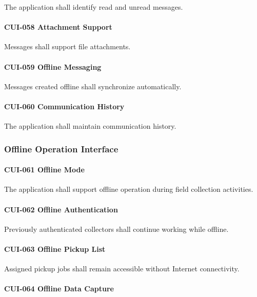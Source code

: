 The application shall identify read and unread messages.

\paragraph{CUI-058 Attachment Support}

Messages shall support file attachments.

\paragraph{CUI-059 Offline Messaging}

Messages created offline shall synchronize automatically.

\paragraph{CUI-060 Communication History}

The application shall maintain communication history.


\subsubsection*{Offline Operation Interface}

\paragraph{CUI-061 Offline Mode}

The application shall support offline operation during field collection
activities.

\paragraph{CUI-062 Offline Authentication}

Previously authenticated collectors shall continue working while
offline.

\paragraph{CUI-063 Offline Pickup List}

Assigned pickup jobs shall remain accessible without Internet
connectivity.

\paragraph{CUI-064 Offline Data Capture}

